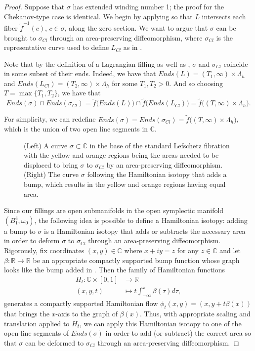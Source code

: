 \documentclass[10pt,a4paper]{amsart}
\newcommand{\C}{\mathbb{C}}
\newcommand{\R}{\mathbb{R}}
\newcommand{\sse}{\subset}
\begin{document}
\begin{proof}
Suppose that $\sigma$ has extended winding number 1; the proof for the Chekanov-type case is identical. We begin by applying  so that $L$ intersects each fiber $\tilde{f}^{-1}(c)$, $c\in \sigma$, along the zero section. We want to argue that $\sigma$ can be brought to $\sigma_{Cl}$ through an area-preserving diffeomorphism, where $\sigma_{Cl}$ is the representative curve used to define $L_{Cl}$ as in . 

Note that by the definition of a Lagrangian filling as well as , $\sigma$ and $\sigma_{Cl}$ coincide in some subset of their ends. Indeed, we have that $Ends(L)=(T_1,\infty)\times \Lambda_h$ and $Ends(L_{Cl})=(T_2,\infty)\times \Lambda_h$ for some $T_1,T_2>0$. And so choosing $T=\max \{T_1,T_2\}$, we have that
$$Ends(\sigma)\cap Ends(\sigma_{Cl}) = \tilde{f}\big(Ends(L)\big)\cap\tilde{f}\big(Ends(L_{Cl})\big) = \tilde{f}\big((T,\infty)\times \Lambda_h\big).$$

For simplicity, we can redefine $Ends(\sigma)=Ends(\sigma_{Cl}) = \tilde{f}\big((T,\infty)\times \Lambda_h\big)$, which is the union of two open line segments in $\C$.

\begin{center}
	\begin{figure}[h!]
		\centering
		
		\caption{(Left) A curve $\sigma\sse \C$ in the base of the standard Lefschetz fibration with the yellow and orange regions being the areas needed to be displaced to bring $\sigma$ to $\sigma_{Cl}$ by an area-preserving diffeomorphism. (Right) The curve $\sigma$ following the Hamiltonian isotopy that adds a bump, which results in the yellow and orange regions having equal area.\vspace{.15cm}}
		\label{fig:horiz_iso_1}
	\end{figure}
\end{center}

Since our fillings are open submanifolds in the open symplectic manifold $(B^4_1,\omega_0)$, the following idea is possible to define a Hamiltonian isotopy: adding a bump to $\sigma$ is a Hamiltonian isotopy that adds or subtracts the necessary area in order to deform $\sigma$ to $\sigma_{Cl}$ through an area-preserving diffeomorphism. Rigorously, fix coordinates $(x,y)\in \C$ where $x+iy=z$ for any $z\in\C$ and let $\beta:\R\to \R$ be an appropriate compactly supported bump function whose graph looks like the bump added in . Then the family of Hamiltonian functions
\begin{align*}
H_t:\C\times [0,1]&\to \R\\
(x,y,t)&\mapsto t\int_{-\infty}^x \beta(\tau)d\tau,
\end{align*}
generates a compactly supported Hamiltonian flow $\phi_t(x,y) = (x,y+t\beta(x))$ that brings the $x$-axis to the graph of $\beta(x)$. Thus, with appropriate scaling and translation applied to $H_t$, we can apply this Hamiltonian isotopy to one of the open line segments of $Ends(\sigma)$ in order to add (or subtract) the correct area so that $\sigma$ can be deformed to $\sigma_{Cl}$ through an area-preserving diffeomorphism.


\end{proof}
\end{document}
